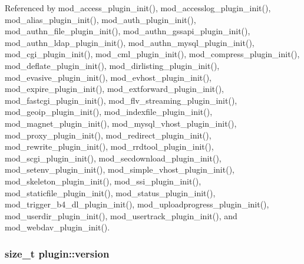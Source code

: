 Referenced by mod\-\_\-access\-\_\-plugin\-\_\-init(), mod\-\_\-accesslog\-\_\-plugin\-\_\-init(), mod\-\_\-alias\-\_\-plugin\-\_\-init(), mod\-\_\-auth\-\_\-plugin\-\_\-init(), mod\-\_\-authn\-\_\-file\-\_\-plugin\-\_\-init(), mod\-\_\-authn\-\_\-gssapi\-\_\-plugin\-\_\-init(), mod\-\_\-authn\-\_\-ldap\-\_\-plugin\-\_\-init(), mod\-\_\-authn\-\_\-mysql\-\_\-plugin\-\_\-init(), mod\-\_\-cgi\-\_\-plugin\-\_\-init(), mod\-\_\-cml\-\_\-plugin\-\_\-init(), mod\-\_\-compress\-\_\-plugin\-\_\-init(), mod\-\_\-deflate\-\_\-plugin\-\_\-init(), mod\-\_\-dirlisting\-\_\-plugin\-\_\-init(), mod\-\_\-evasive\-\_\-plugin\-\_\-init(), mod\-\_\-evhost\-\_\-plugin\-\_\-init(), mod\-\_\-expire\-\_\-plugin\-\_\-init(), mod\-\_\-extforward\-\_\-plugin\-\_\-init(), mod\-\_\-fastcgi\-\_\-plugin\-\_\-init(), mod\-\_\-flv\-\_\-streaming\-\_\-plugin\-\_\-init(), mod\-\_\-geoip\-\_\-plugin\-\_\-init(), mod\-\_\-indexfile\-\_\-plugin\-\_\-init(), mod\-\_\-magnet\-\_\-plugin\-\_\-init(), mod\-\_\-mysql\-\_\-vhost\-\_\-plugin\-\_\-init(), mod\-\_\-proxy\-\_\-plugin\-\_\-init(), mod\-\_\-redirect\-\_\-plugin\-\_\-init(), mod\-\_\-rewrite\-\_\-plugin\-\_\-init(), mod\-\_\-rrdtool\-\_\-plugin\-\_\-init(), mod\-\_\-scgi\-\_\-plugin\-\_\-init(), mod\-\_\-secdownload\-\_\-plugin\-\_\-init(), mod\-\_\-setenv\-\_\-plugin\-\_\-init(), mod\-\_\-simple\-\_\-vhost\-\_\-plugin\-\_\-init(), mod\-\_\-skeleton\-\_\-plugin\-\_\-init(), mod\-\_\-ssi\-\_\-plugin\-\_\-init(), mod\-\_\-staticfile\-\_\-plugin\-\_\-init(), mod\-\_\-status\-\_\-plugin\-\_\-init(), mod\-\_\-trigger\-\_\-b4\-\_\-dl\-\_\-plugin\-\_\-init(), mod\-\_\-uploadprogress\-\_\-plugin\-\_\-init(), mod\-\_\-userdir\-\_\-plugin\-\_\-init(), mod\-\_\-usertrack\-\_\-plugin\-\_\-init(), and mod\-\_\-webdav\-\_\-plugin\-\_\-init().

\hypertarget{structplugin_aa4b3d495a0ae1df759643b712d91068f}{
\subsubsection[{version}]{\setlength{\rightskip}{0pt plus 5cm}size\-\_\-t plugin\-::version}}\label{structplugin_aa4b3d495a0ae1df759643b712d91068f}


